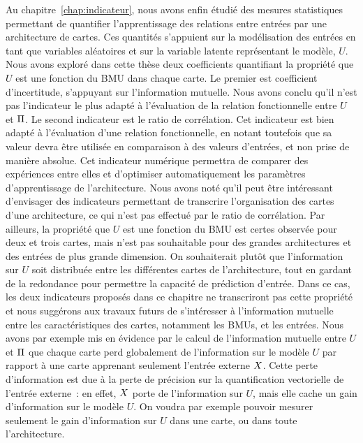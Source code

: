 Au chapitre~\ref{chap:indicateur}, nous avons enfin étudié des mesures statistiques permettant de quantifier l'apprentissage des relations entre entrées par une architecture de cartes.
Ces quantités s'appuient sur la modélisation des entrées en tant que variables aléatoires et sur la variable latente représentant le modèle, $U$.
Nous avons exploré dans cette thèse deux coefficients quantifiant la propriété que $U$ est une fonction du BMU dans chaque carte. Le premier est coefficient d'incertitude, s'appuyant sur l'information mutuelle. Nous avons conclu qu'il n'est pas l'indicateur le plus adapté à l'évaluation de la relation fonctionnelle entre $U$ et $\Pi$.
Le second indicateur est le ratio de corrélation. Cet indicateur est bien adapté à l'évaluation d'une relation fonctionnelle, en notant toutefois que sa valeur devra être utilisée en comparaison à des valeurs d'entrées, et non prise de manière absolue. Cet indicateur numérique permettra de comparer des expériences entre elles et d'optimiser automatiquement les paramètres d'apprentissage de l'architecture.
Nous avons noté qu'il peut être intéressant d'envisager des indicateurs permettant de transcrire l'organisation des cartes d'une architecture, ce qui n'est pas effectué par le ratio de corrélation.
Par ailleurs, la propriété que $U$ est une fonction du BMU est certes observée pour deux et trois cartes, mais n'est pas souhaitable pour des grandes architectures et des entrées de plus grande dimension.
On souhaiterait plutôt que l'information sur $U$ soit distribuée entre les différentes cartes de l'architecture, tout en gardant de la redondance pour permettre la capacité de prédiction d'entrée.
Dans ce cas, les deux indicateurs proposés dans ce chapitre ne transcriront pas cette propriété et nous suggérons aux travaux futurs de s'intéresser à l'information mutuelle entre les caractéristiques des cartes, notamment les BMUs, et les entrées. Nous avons par exemple mis en évidence par le calcul de l'information mutuelle entre $U$ et $\Pi$ que chaque carte perd globalement de l'information sur le modèle $U$ par rapport à une carte apprenant seulement l'entrée externe $X$.
Cette perte d'information est due à la perte de précision sur la quantification vectorielle de l'entrée externe~: en effet, $X$ porte de l'information sur $U$, mais elle cache un gain d'information sur le modèle $U$.
On voudra par exemple pouvoir mesurer seulement le gain d'information sur $U$ dans une carte, ou dans toute l'architecture.

